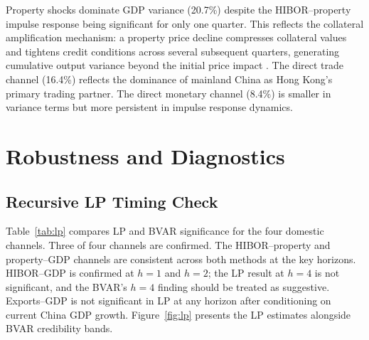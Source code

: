 \documentclass[12pt,a4paper]{article}
\begin{document}
Property shocks dominate GDP variance (20.7\%) despite the HIBOR--property impulse
response being significant for only one quarter. This reflects the collateral
amplification mechanism: a property price decline compresses collateral values and
tightens credit conditions across several subsequent quarters, generating cumulative
output variance beyond the initial price impact \citep{GoodhartHofmann2008}. The direct trade channel (16.4\%) reflects the dominance of
mainland China as Hong Kong's primary trading partner. The direct monetary channel
(8.4\%) is smaller in variance terms but more persistent in impulse response
dynamics.

\section{Robustness and Diagnostics}
\label{sec:robustness}

\subsection{Recursive LP Timing Check}
\label{sec:lp}

Table~\ref{tab:lp} compares LP and BVAR significance for the four domestic
channels. Three of four channels are confirmed. The HIBOR--property and
property--GDP channels are consistent across both methods at the key horizons.
HIBOR--GDP is confirmed at $h = 1$ and $h = 2$; the LP result at $h = 4$ is not
significant, and the BVAR's $h = 4$ finding should be treated as suggestive.
Exports--GDP is not significant in LP at any horizon after conditioning on current
China GDP growth. Figure~\ref{fig:lp} presents the LP estimates alongside BVAR
credibility bands.
\end{document}
